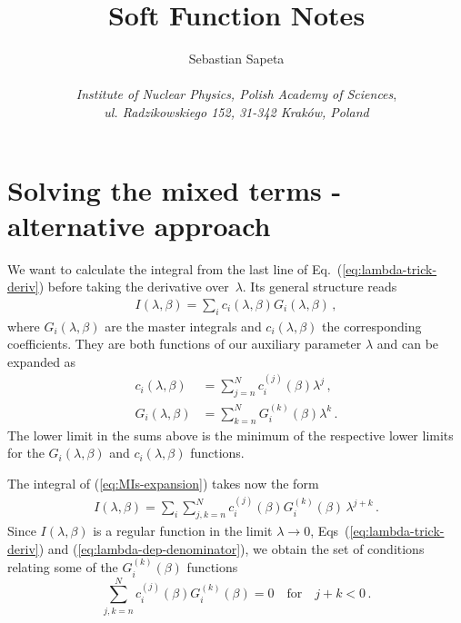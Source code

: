 \documentclass[a4paper,11pt]{article}
\title{\sc Soft Function Notes}
\author{
  Sebastian Sapeta \\ \\
  {\it Institute of Nuclear Physics, Polish Academy of Sciences}, \\ 
  {\it ul. Radzikowskiego 152, 31-342 Krak\'ow, Poland}
}
\numberwithin{equation}{section}
\begin{document}
\maketitle


\tableofcontents

\section{Solving the mixed terms - alternative approach}

We want to calculate the integral from the last line of
Eq.~(\ref{eq:lambda-trick-deriv}) before taking the derivative over~$\lambda$.
Its general structure reads
%
\begin{eqnarray}
  I(\lambda,\beta) = \sum_i c_i(\lambda,\beta) G_i(\lambda, \beta)\,,
  \label{eq:MIs-expansion}
\end{eqnarray}
%
where $G_i(\lambda,\beta)$ are the master integrals and $c_i(\lambda,\beta)$ the
corresponding coefficients. They are both functions of our auxiliary parameter
$\lambda$ and can be expanded as
%
\begin{subequations}
  \begin{align}
    c_i(\lambda,\beta) & = \sum_{j=n}^{N} c_i^{(j)}(\beta) \lambda^j\,,
    \\
    G_i(\lambda,\beta) & = \sum_{k=n}^{N} G_i^{(k)}(\beta) \lambda^k\,.
  \end{align}
\end{subequations}
%
The lower limit in the sums above is the minimum of the respective lower limits
for the $G_i(\lambda,\beta)$ and $c_i(\lambda,\beta)$ functions.

The integral of (\ref{eq:MIs-expansion}) takes now the form
%
\begin{eqnarray}
  I(\lambda,\beta) = 
  \sum_i \sum_{j,k=n}^{N} c_i^{(j)}(\beta) G_i^{(k)}(\beta)\, \lambda^{j+k}\,.
\end{eqnarray}
%
Since $I(\lambda,\beta)$ is a regular function in the limit $\lambda \to 0$, \cf
Eqs~(\ref{eq:lambda-trick-deriv}) and (\ref{eq:lambda-dep-denominator}), we
obtain the set of conditions relating some of the $G_i^{(k)}(\beta)$ functions
%
\begin{equation}
  \sum_{j,k=n}^{N} c_i^{(j)}(\beta) G_i^{(k)}(\beta)  = 0 
  \quad \text{for} \quad j+k < 0\,.
\end{equation}
\end{document}
